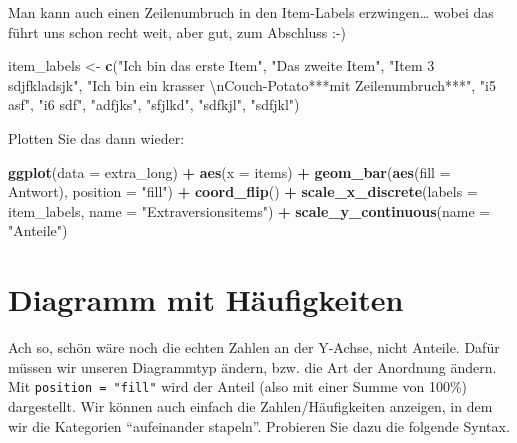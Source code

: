 \documentclass[12pt,ngerman,]{book}
\makeatletter
\newenvironment{Shaded}{\begin{snugshade}}{\end{snugshade}}
\newcommand{\KeywordTok}[1]{\textcolor[rgb]{0.13,0.29,0.53}{\textbf{#1}}}
\newcommand{\DataTypeTok}[1]{\textcolor[rgb]{0.13,0.29,0.53}{#1}}
\newcommand{\CharTok}[1]{\textcolor[rgb]{0.31,0.60,0.02}{#1}}
\newcommand{\StringTok}[1]{\textcolor[rgb]{0.31,0.60,0.02}{#1}}
\newcommand{\OperatorTok}[1]{\textcolor[rgb]{0.81,0.36,0.00}{\textbf{#1}}}
\newcommand{\NormalTok}[1]{#1}
\newenvironment{kframe}{%
\medskip{}
\setlength{\fboxsep}{.8em}
 \def\at@end@of@kframe{}%
 \ifinner\ifhmode%
  \def\at@end@of@kframe{\end{minipage}}%
  \begin{minipage}{\columnwidth}%
 \fi\fi%
 \def\FrameCommand##1{\hskip\@totalleftmargin \hskip-\fboxsep
 \colorbox{shadecolor}{##1}\hskip-\fboxsep
     \hskip-\linewidth \hskip-\@totalleftmargin \hskip\columnwidth}%
 \MakeFramed {\advance\hsize-\width
   \@totalleftmargin\z@ \linewidth\hsize
   \@setminipage}}%
 {\par\unskip\endMakeFramed%
 \at@end@of@kframe}
\renewenvironment{Shaded}{\begin{kframe}}{\end{kframe}}
\theoremstyle{definition}
\theoremstyle{definition}
\theoremstyle{remark}
\makeatother
\begin{document}
Man kann auch einen Zeilenumbruch in den Item-Labels erzwingen\ldots{}
wobei das führt uns schon recht weit, aber gut, zum Abschluss :-)

\begin{Shaded}
\begin{Highlighting}[]
\NormalTok{item_labels <-}\StringTok{ }\KeywordTok{c}\NormalTok{(}\StringTok{"Ich bin das erste Item"}\NormalTok{,}
                 \StringTok{"Das zweite Item"}\NormalTok{,}
                 \StringTok{"Item 3 sdjfkladsjk"}\NormalTok{,}
                 \StringTok{"Ich bin ein krasser }\CharTok{\textbackslash{}n}\StringTok{Couch-Potato***mit Zeilenumbruch***"}\NormalTok{,}
\StringTok{"i5 asf"}\NormalTok{, }\StringTok{"i6 sdf"}\NormalTok{, }\StringTok{"adfjks"}\NormalTok{, }\StringTok{"sfjlkd"}\NormalTok{, }\StringTok{"sdfkjl"}\NormalTok{, }\StringTok{"sdfjkl"}\NormalTok{)}
\end{Highlighting}
\end{Shaded}

Plotten Sie das dann wieder:

\begin{Shaded}
\begin{Highlighting}[]
\KeywordTok{ggplot}\NormalTok{(}\DataTypeTok{data =}\NormalTok{ extra_long) }\OperatorTok{+}
\StringTok{  }\KeywordTok{aes}\NormalTok{(}\DataTypeTok{x =}\NormalTok{ items)  }\OperatorTok{+}
\StringTok{  }\KeywordTok{geom_bar}\NormalTok{(}\KeywordTok{aes}\NormalTok{(}\DataTypeTok{fill =}\NormalTok{ Antwort), }\DataTypeTok{position =} \StringTok{"fill"}\NormalTok{) }\OperatorTok{+}
\StringTok{  }\KeywordTok{coord_flip}\NormalTok{() }\OperatorTok{+}
\StringTok{  }\KeywordTok{scale_x_discrete}\NormalTok{(}\DataTypeTok{labels =}\NormalTok{ item_labels, }\DataTypeTok{name =} \StringTok{"Extraversionsitems"}\NormalTok{) }\OperatorTok{+}
\StringTok{  }\KeywordTok{scale_y_continuous}\NormalTok{(}\DataTypeTok{name =} \StringTok{"Anteile"}\NormalTok{)}
\end{Highlighting}
\end{Shaded}

\section{Diagramm mit Häufigkeiten}\label{diagramm-mit-haufigkeiten}

Ach so, schön wäre noch die echten Zahlen an der Y-Achse, nicht Anteile.
Dafür müssen wir unseren Diagrammtyp ändern, bzw. die Art der Anordnung
ändern. Mit \texttt{position\ =\ "fill"} wird der Anteil (also mit einer
Summe von 100\%) dargestellt. Wir können auch einfach die
Zahlen/Häufigkeiten anzeigen, in dem wir die Kategorien ``aufeinander
stapeln''. Probieren Sie dazu die folgende Syntax.
\end{document}

